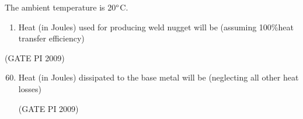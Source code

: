 \documentclass[journal,12pt,onecolumn]{IEEEtran}
\theoremstyle{remark}
\begin{document}
The ambient temperature is 20$\degree$C.

\begin{enumerate}[label=Q.\arabic*), leftmargin=*, resume]

\item Heat (in Joules) used for producing weld nugget will be (assuming 100\%heat transfer efficiency)
\begin{enumerate}[label=(\Alph*)]
\end{enumerate}
\end{enumerate}
\hfill (GATE PI 2009)
\begin{enumerate}[label=Q.\arabic*)]
   \setcounter{enumi}{59}
\item Heat (in Joules) dissipated to the base metal will be (neglecting all other heat losses)
\begin{enumerate}[label=(\Alph*)]
\end{enumerate}
\hfill (GATE PI 2009)

\end{enumerate}
\end{document}
